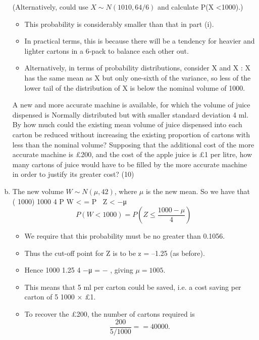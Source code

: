 \documentclass[a4paper,12pt]{article}
\begin{document}
\begin{enumerate}[(a)]
(Alternatively, could use $X \sim N(1010, 64/6)$ and calculate P(X <1000).)
\begin{itemize}
    \item This probability is considerably smaller than that in part (i).
    \item In practical terms, this is
because there will be a tendency for heavier and lighter cartons in a 6-pack to balance
each other out. 
\item Alternatively, in terms of probability distributions, consider X and X : X has the same mean as X but only one-sixth of the variance, so less of the lower tail
of the distribution of X is below the nominal volume of 1000.
\end{itemize}
\newpage
\begin{framed}
\noindent A new and more accurate machine is available, for which the volume of juice dispensed is Normally distributed but with smaller standard deviation 4 ml.  By how much could the existing mean volume of juice dispensed into each carton be reduced without increasing the existing proportion of cartons with less than the nominal volume?  Supposing that the additional cost of the more accurate machine is £200, and the cost of the apple juice is £1 per litre, how many cartons of juice would have to be filled by the more accurate machine in order to justify its greater cost? (10) 
\end{framed}
\item The new volume $W \sim N(\mu, 42)$, where $\mu$ is the new mean. So we have that
( 1000) 1000
4
P W < = P Z < −μ 
 
\[P(W <  1000) = P(Z \leq \frac{1000-\mu}{4} ) \] 

\begin{itemize}
\item 
We require that this probability must be no greater
than 0.1056.
\item Thus the cut-off point for Z is to be z = –1.25 (as before).
\item Hence
1000 1.25
4
−μ = − , giving $\mu = 1005$.
\item This means that 5 ml per carton could be saved, i.e. a cost saving per carton of
5
1000
× £1. 
\item To recover the £200, the number of cartons required is 
\[ \frac{200}{5/1000} = 
= 40000.\]
\end{itemize}

\end{enumerate}
\end{document}
